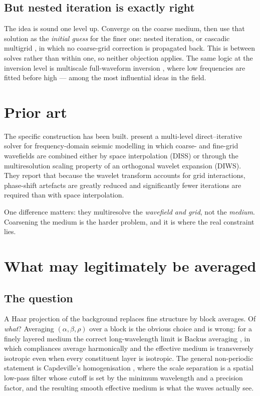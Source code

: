 \documentclass[11pt,a4paper]{article}
\begin{document}
\subsection{But nested iteration is exactly right}

The idea is sound one level up.  Converge on the coarse medium, then use that
solution as the \emph{initial guess} for the finer one: nested iteration, or
cascadic multigrid \citep{bornemann1996}, in which no coarse-grid correction is
propagated back.  This is between solves rather than within one, so neither
objection applies.  The same logic at the inversion level is multiscale
full-waveform inversion \citep{bunks1995}, where low frequencies are fitted
before high --- among the most influential ideas in the field.

\section{Prior art}

The specific construction has been built.  \citet{hustedt2004} present a
multi-level direct--iterative solver for frequency-domain seismic modelling in
which coarse- and fine-grid wavefields are combined either by space
interpolation (DISS) or through the multiresolution scaling property of an
orthogonal wavelet expansion (DIWS).  They report that because the wavelet
transform accounts for grid interactions, phase-shift artefacts are greatly
reduced and significantly fewer iterations are required than with space
interpolation.

One difference matters: they multiresolve the \emph{wavefield and grid}, not
the \emph{medium}.  Coarsening the medium is the harder problem, and it is
where the real constraint lies.

\section{What may legitimately be averaged}

\subsection{The question}

A Haar projection of the background replaces fine structure by block averages.
Of \emph{what}?  Averaging $(\alpha,\beta,\rho)$ over a block is the obvious
choice and is wrong: for a finely layered medium the correct long-wavelength
limit is Backus averaging \citep{backus1962}, in which compliances average
harmonically and the effective medium is transversely isotropic even when every
constituent layer is isotropic.  The general non-periodic statement is
Capdeville's homogenisation \citep{capdeville2010,capdeville2018}, where the
scale separation is a spatial low-pass filter whose cutoff is set by the
minimum wavelength and a precision factor, and the resulting smooth effective
medium is what the waves actually see.
\end{document}
